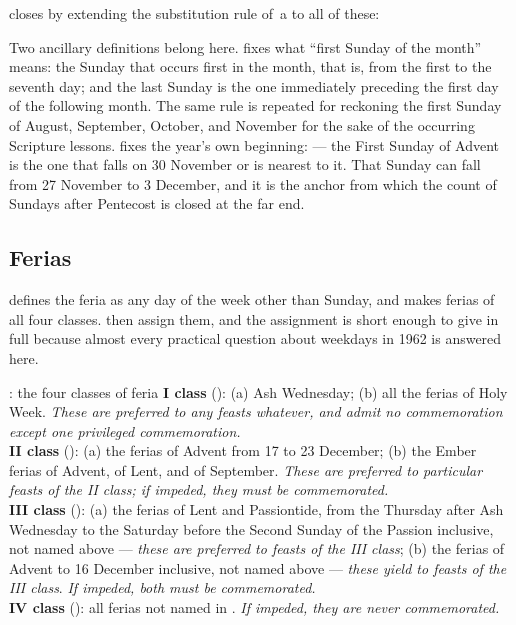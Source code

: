  closes by extending the substitution rule of \,a to all of these: 

Two ancillary definitions belong here.  fixes what ``first Sunday of the month'' means:
the Sunday that occurs first in the month, that is, from the first to the seventh day; and the
last Sunday is the one immediately preceding the first day of the following month. The same
rule is repeated for reckoning the first Sunday of August, September, October, and November for
the sake of the occurring Scripture lessons.  fixes the year's own beginning:
 — the
First Sunday of Advent is the one that falls on 30 November or is nearest to it. That Sunday can
fall from 27 November to 3 December, and it is the anchor from which the count of Sundays after
Pentecost is closed at the far end.

\subsection{Ferias}

 defines the feria as any day of the week other than Sunday, and  makes ferias of
all four classes.  then assign them, and the assignment is short enough to give in
full because almost every practical question about weekdays in 1962 is answered here.

\begin{studybox}{: the four classes of feria}
\textbf{I class} (): (a) Ash Wednesday; (b) all the ferias of Holy Week. \emph{These are
preferred to any feasts whatever, and admit no commemoration except one privileged
commemoration.}\\[0.35em]
\textbf{II class} (): (a) the ferias of Advent from 17 to 23 December; (b) the Ember
ferias of Advent, of Lent, and of September. \emph{These are preferred to particular feasts of
the II class; if impeded, they must be commemorated.}\\[0.35em]
\textbf{III class} (): (a) the ferias of Lent and Passiontide, from the Thursday after
Ash Wednesday to the Saturday before the Second Sunday of the Passion inclusive, not named
above — \emph{these are preferred to feasts of the III class}; (b) the ferias of Advent to
16 December inclusive, not named above — \emph{these yield to feasts of the III class}.
\emph{If impeded, both must be commemorated.}\\[0.35em]
\textbf{IV class} (): all ferias not named in . \emph{If impeded, they are
never commemorated.}
\end{studybox}

